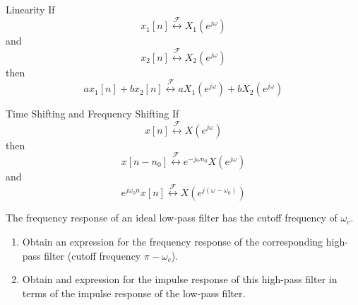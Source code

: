 \begin{frame}{Linearity}
    If
    \begin{equation*}
        x_1[n] \overset{\mathcal{F}}{\leftrightarrow} X_1(e^{j\omega})
    \end{equation*}
    and
    \begin{equation*}
        x_2[n] \overset{\mathcal{F}}{\leftrightarrow} X_2(e^{j\omega})
    \end{equation*}
    then
    \begin{equation*}
        ax_1[n] + bx_2[n] \overset{\mathcal{F}}{\leftrightarrow} aX_1(e^{j\omega}) + bX_2(e^{j\omega})
    \end{equation*}
\end{frame}

\begin{frame}{Time Shifting and Frequency Shifting}
    If
    \begin{equation*}
        x[n] \overset{\mathcal{F}}{\leftrightarrow} X(e^{j\omega})
    \end{equation*}
    then
    \begin{equation*}
        x[n-n_0] \overset{\mathcal{F}}{\leftrightarrow} e^{-j\omega n_0}X(e^{j\omega})
    \end{equation*}
    and
    \begin{equation*}
        e^{j\omega_0 n}x[n] \overset{\mathcal{F}}{\leftrightarrow} X\left(e^{j(\omega - \omega_0)}\right)
    \end{equation*}
\end{frame}



\begin{frame}
    \begin{example}
        The frequency response of an ideal low-pass filter has the cutoff frequency of $\omega_c$.
        \begin{enumerate}
            \item Obtain an expression for the frequency response of the corresponding high-pass filter (cutoff frequency $\pi - \omega_c$).
            \item Obtain and expression for the impulse response of this high-pass filter in terms of the impulse response of the low-pass filter.
        \end{enumerate}
     \end{example}
\end{frame}



